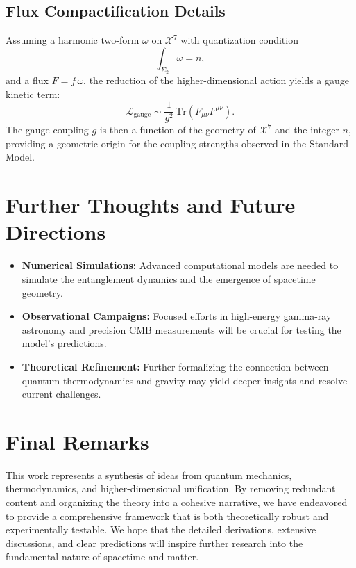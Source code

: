 \documentclass[12pt, a4paper]{article}
\begin{document}
\subsection{Flux Compactification Details}
Assuming a harmonic two-form \(\omega\) on \(\mathcal{X}^7\) with quantization condition
\begin{equation}
    \int_{\Sigma_2} \omega = n,
\end{equation}
and a flux \(F = f\,\omega\), the reduction of the higher-dimensional action yields a gauge kinetic term:
\begin{equation}
    \mathcal{L}_{\text{gauge}} \sim \frac{1}{g^2} \, \text{Tr}(F_{\mu\nu} F^{\mu\nu}).
\end{equation}
The gauge coupling \(g\) is then a function of the geometry of \(\mathcal{X}^7\) and the integer \(n\), providing a geometric origin for the coupling strengths observed in the Standard Model.

\section{Further Thoughts and Future Directions}
\begin{itemize}
    \item \textbf{Numerical Simulations:} Advanced computational models are needed to simulate the entanglement dynamics and the emergence of spacetime geometry.
    \item \textbf{Observational Campaigns:} Focused efforts in high-energy gamma-ray astronomy and precision CMB measurements will be crucial for testing the model’s predictions.
    \item \textbf{Theoretical Refinement:} Further formalizing the connection between quantum thermodynamics and gravity may yield deeper insights and resolve current challenges.
\end{itemize}

\section*{Final Remarks}
This work represents a synthesis of ideas from quantum mechanics, thermodynamics, and higher-dimensional unification. By removing redundant content and organizing the theory into a cohesive narrative, we have endeavored to provide a comprehensive framework that is both theoretically robust and experimentally testable. We hope that the detailed derivations, extensive discussions, and clear predictions will inspire further research into the fundamental nature of spacetime and matter.
\end{document}
